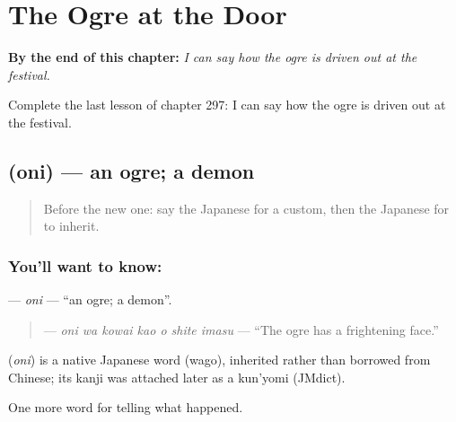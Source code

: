 
\chapter{The Ogre at the Door}
\label{ch:ja-the-ogre-at-the-door}

\begin{chapteropening}
\textbf{By the end of this chapter:} \emph{I can say how the ogre is driven out at the festival.}

Complete the last lesson of chapter 297: I can say how the ogre is driven out at the festival.
\end{chapteropening}

\section[\texorpdfstring{\ja{おに} (oni)}{おに (oni)}]{ (oni) — an ogre; a demon}

\label{lesson:JA-C297-oni}



\begin{quote}
Before the new one: say the Japanese for a custom, then the Japanese for to inherit.
\end{quote}

\subsection*{You'll want to know: }
\textbf{} — \emph{oni} — \textquotedblleft{}an ogre; a demon\textquotedblright{}.

\begin{quote}
\textbf{   } — \emph{oni wa kowai kao o shite imasu} — \textquotedblleft{}The ogre has a frightening face.\textquotedblright{}
\end{quote}

\begin{cousinweb}
\textbf{} (\emph{oni}) is a native Japanese word (wago), inherited rather than borrowed from Chinese; its kanji was attached later as a kun'yomi (JMdict).
\end{cousinweb}

\begin{grammarlens}[title={What you've built}]
One more word for telling what happened.
\end{grammarlens}

